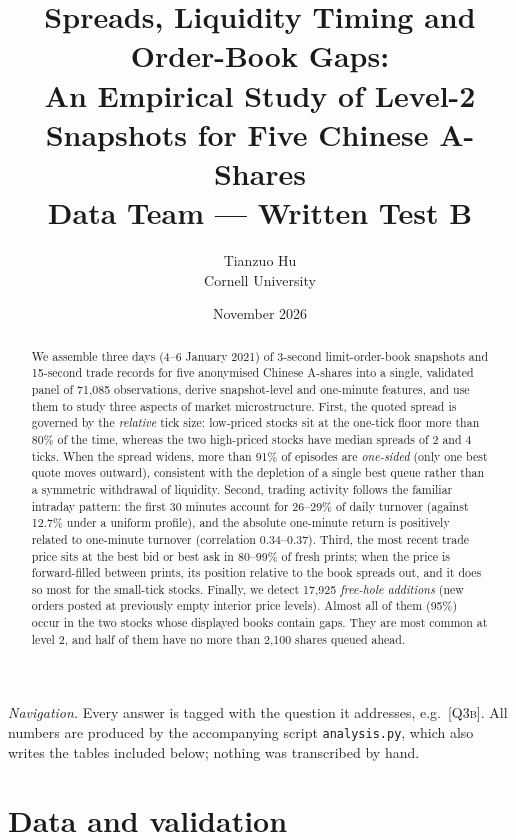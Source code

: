 \documentclass[11pt,a4paper]{article}
\title{\textbf{Spreads, Liquidity Timing and Order-Book Gaps:\\
An Empirical Study of Level-2 Snapshots for Five Chinese A-Shares}\\[0.6em]
\large Data Team --- Written Test B}
\author{Tianzuo Hu\\[0.2em]\normalsize Cornell University}
\date{November 2026}
\newcommand{\Q}[1]{\textsc{[Q#1]}}
\newcommand{\code}[1]{\texttt{#1}}
\begin{document}
\maketitle

\begin{abstract}
\noindent
We assemble three days (4--6 January 2021) of 3-second limit-order-book snapshots and 15-second
trade records for five anonymised Chinese A-shares into a single, validated panel of 71{,}085
observations, derive snapshot-level and one-minute features, and use them to study three
aspects of market microstructure. First, the quoted spread is governed by the \emph{relative} tick
size: low-priced stocks sit at the one-tick floor more than 80\% of the time, whereas the two
high-priced stocks have median spreads of 2 and 4 ticks. When the spread widens, more than 91\%
of episodes are \emph{one-sided} (only one best quote moves outward), consistent with the
depletion of a single best queue rather than a symmetric withdrawal of liquidity. Second,
trading activity follows the familiar intraday pattern: the first 30 minutes account for 26--29\%
of daily turnover (against 12.7\% under a uniform profile), and the absolute one-minute return is
positively related to one-minute turnover (correlation 0.34--0.37). Third, the most recent trade
price sits at the best bid or best ask in 80--99\% of fresh prints; when the price is forward-filled
between prints, its position relative to the book spreads out, and it does so most for the
small-tick stocks. Finally, we detect 17{,}925 \emph{free-hole additions} (new orders posted at
previously empty interior price levels). Almost all of them (95\%) occur in the two stocks whose
displayed books contain gaps. They are most common at level 2, and half of them have no more
than 2{,}100 shares queued ahead.
\end{abstract}

\tableofcontents
\vspace{0.5em}
\noindent\textit{Navigation.} Every answer is tagged with the question it addresses, e.g.\ \Q{3b}.
All numbers are produced by the accompanying script \code{analysis.py}, which also writes the
tables included below; nothing was transcribed by hand.

\section{Data and validation}\label{sec:data}
\end{document}
